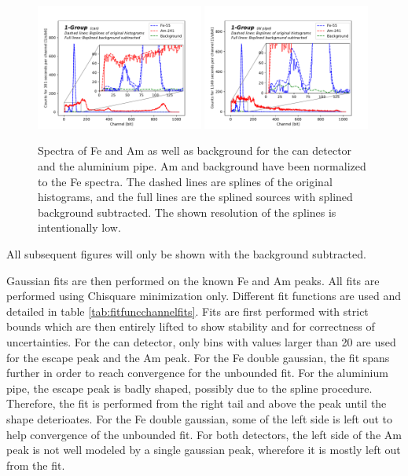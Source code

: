 \begin{figure}[htb]
  \includegraphics[width=0.49\textwidth]{graphics/bkgsubtraction.pdf}
  \includegraphics[width=0.49\textwidth]{graphics/alubkgsubtraction.pdf}
  \caption{Spectra of Fe and Am as well as background for the can detector and the aluminium pipe. Am and background have been normalized to the Fe spectra. The dashed lines are splines of the original histograms, and the full lines are the splined sources with splined background subtracted. The shown resolution of the splines is intentionally low.}
  \label{fig:spectra}
\end{figure}

All subsequent figures will only be shown with the background subtracted.

Gaussian fits are then performed on the known Fe and Am peaks. All fits are performed using Chisquare minimization only. Different fit functions are used and detailed in table \ref{tab:fitfuncchannelfits}. Fits are first performed with strict bounds which are then entirely lifted to show stability and for correctness of uncertainties. For the can detector, only bins with values larger than 20 are used for the escape peak and the Am peak. For the Fe double gaussian, the fit spans further in order to reach convergence for the unbounded fit. For the aluminium pipe, the escape peak is badly shaped, possibly due to the spline procedure. Therefore, the fit is performed from the right tail and above the peak until the shape deterioates. For the Fe double gaussian, some of the left side is left out to help convergence of the unbounded fit. For both detectors, the left side of the Am peak is not well modeled by a single gaussian peak, wherefore it is mostly left out from the fit.

